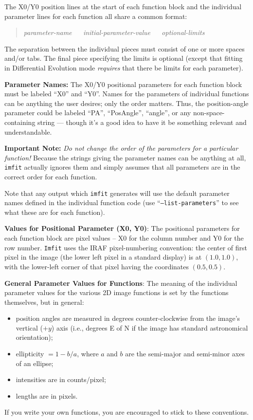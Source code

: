 \documentclass[10pt]{article}
\newcommand{\imfit}{\texttt{imfit}}
\newcommand{\Imfit}{\texttt{Imfit}}
\begin{document}
The X0/Y0 position lines at the start of each function block and the
individual parameter lines for each function all share a common format:
\begin{quote}
\textit{parameter-name} ~~ \textit{initial-parameter-value} ~~ \textit{optional-limits}
\end{quote}
The separation between the individual pieces must consist of one or more spaces
and/or tabs. The final piece specifying the limits is optional (except that
fitting in Differential Evolution mode \textit{requires} that there be limits
for each parameter).

\bigskip

\textbf{Parameter Names:} The X0/Y0 positional parameters for each
function block must be labeled ``X0'' and ``Y0''. Names for the
parameters of individual functions can be anything the user desires;
only the order matters. Thus, the position-angle parameter could be
labeled ``PA'', ``PosAngle'', ``angle'', or any non-space-containing
string --- though it's a good idea to have it be something relevant
and understandable.

\textbf{Important Note:} \textit{Do not change the order of the parameters
for a particular function!}  Because the strings giving the parameter names
can be anything at all, \imfit{} actually ignores them and simply assumes
that all parameters are in the correct order for each function.

Note that any output which \imfit{} generates will use the default parameter
names defined in the individual function code (use ``\texttt{--list-parameters}''
to see what these are for each function).

\bigskip

\textbf{Values for Positional Parameter (X0, Y0)}: The positional parameters
for each function block are pixel values -- X0 for the column number and
Y0 for the row number. \Imfit{} uses the IRAF pixel-numbering
convention: the center of first pixel in the image (the lower left pixel
in a standard display) is at $(1.0,1.0)$, with the lower-left corner of that
pixel having the coordinates $(0.5,0.5)$.

\bigskip

\textbf{General Parameter Values for Functions}: The meaning of the individual
parameter values for the various 2D image functions is set by the functions
themselves, but in general: 
\begin{itemize}
\item position angles are measured in degrees counter-clockwise
from the image's vertical ($+y$) axis (i.e., degrees E of N if the image has standard
astronomical orientation);
\item ellipticity $= 1 - b/a$, where $a$ and $b$ are the
semi-major and semi-minor axes of an ellipse;
\item intensities are in counts/pixel;
\item lengths are in pixels. 
\end{itemize}
If you write your own functions, you are encouraged
to stick to these conventions.
\end{document}

